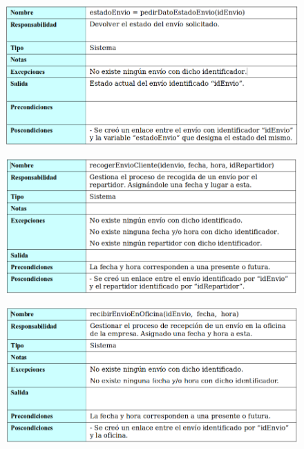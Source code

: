 \begin{figure}[H]
	\centering
	\includegraphics[width=16cm]{35}
\end{figure}
\begin{figure}[H]
	\centering
	\includegraphics[width=16cm]{36}
\end{figure}
\begin{figure}[H]
	\centering
	\includegraphics[width=16cm]{37}
\end{figure}

\newpage

